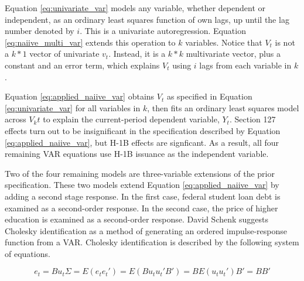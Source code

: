 \documentclass[review]{elsarticle}
\begin{document}
Equation \ref{eq:univariate_var} models any variable,
whether dependent or independent,
as an ordinary least squares function of own lags,
up until the lag number denoted by $i$.
This is a univariate autoregression.
Equation \ref{eq:naiive_multi_var} extends this operation to $k$ variables.
Notice that $V_t$ is not a $k*1$ vector of univariate $v_t$.
Instead, it is a $k*k$ multivariate vector, plus a constant and an error term,
which explains $V_t$ using $i$ lags from each variable in $k$.

Equation \ref{eq:applied_naiive_var}
obtains $V_t$ as specified in Equation \ref{eq:univariate_var}
for all variables in $k$,
then fits an ordinary least squares model across $V_kt$ to explain the current-period dependent variable, $Y_t$.
Section 127 effects turn out to be insignificant in the specification described by Equation \ref{eq:applied_naiive_var},
but H-1B effects are signficant.
As a result, all four remaining VAR equations use H-1B issuance as the independent variable.

Two of the four remaining models are three-variable extensions of the prior specification.
These two models extend Equation \ref{eq:applied_naiive_var} by adding a second stage response.
In the first case, federal student loan debt is examined as a second-order response.
In the second case, the price of higher education is examined as a second-order response.
David Schenk suggests Cholesky identification as a method of generating an ordered impulse-response function from a VAR.
Cholesky identification is described by the following system of equations.

\begin{subequations}
    \begin{equation}
        e_t = Bu_t
        \label{eq:make_structural_shocks}
    \end{equation}
    \begin{equation}
        \Sigma = E(e_t e_t')
        = E(Bu_tu_t'B')
        = B E(u_t u_t') B'
        = B B'
        \label{eq:link_covariance_error}
    \end{equation}
\end{subequations}
\end{document}
